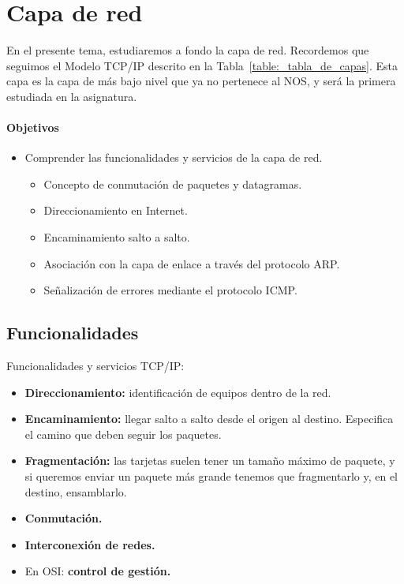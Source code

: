 \chapter{Capa de red}

En el presente tema, estudiaremos a fondo la capa de red. Recordemos que seguimos el Modelo TCP/IP descrito en la Tabla~\ref{table:_tabla_de_capas}.
Esta capa es la capa de más bajo nivel que ya no pertenece al \acrshort{NOS}, y será la primera estudiada en la asignatura.

\subsubsection{Objetivos}

\begin{itemize}
    \item Comprender las funcionalidades y servicios de la capa de red.
        \begin{itemize}
            \item Concepto de conmutación de paquetes y datagramas. 
            \item Direccionamiento en Internet.
            \item Encaminamiento salto a salto.
            \item Asociación con la capa de enlace a través del protocolo \acrshort{ARP}.
            \item Señalización de errores mediante el protocolo \acrshort{ICMP}.
        \end{itemize}
\end{itemize}

\section{Funcionalidades}

Funcionalidades y servicios TCP\@/IP\@:
\begin{itemize}
    \item \textbf{Direccionamiento:} identificación de equipos dentro de la red.
    \item \textbf{Encaminamiento:} llegar salto a salto desde el origen al destino. Especifica el camino que deben seguir los paquetes.
    \item \textbf{Fragmentación:} las tarjetas suelen tener un tamaño máximo de paquete, y si queremos enviar un paquete más grande tenemos que fragmentarlo y, en el destino, ensamblarlo. 
    \item \textbf{Conmutación.} 
    \item \textbf{Interconexión de redes.}
    \item En OSI\@: \textbf{control de gestión.}
\end{itemize}

